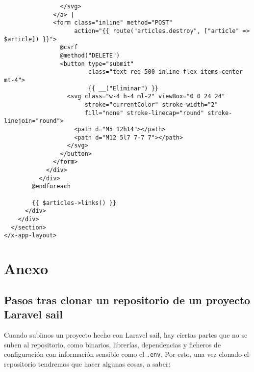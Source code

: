\documentclass[11pt]{article}
\begin{document}
\begin{verbatim}
                </svg>
              </a> |
              <form class="inline" method="POST"
                    action="{{ route("articles.destroy", ["article" => $article]) }}">
                @csrf
                @method("DELETE")
                <button type="submit"
                        class="text-red-500 inline-flex items-center mt-4">
                        {{ __("Eliminar") }}
                  <svg class="w-4 h-4 ml-2" viewBox="0 0 24 24"
                       stroke="currentColor" stroke-width="2"
                       fill="none" stroke-linecap="round" stroke-linejoin="round">
                    <path d="M5 12h14"></path>
                    <path d="M12 5l7 7-7 7"></path>
                  </svg>
                </button>
              </form>
            </div>
          </div>
        @endforeach

        {{ $articles->links() }}
      </div>
    </div>
  </section>
</x-app-layout>
\end{verbatim}

\newpage

\section{Anexo}
\label{sec:org0eab5a6}
\subsection{Pasos tras clonar un repositorio de un proyecto Laravel sail}
\label{sec:orge08f673}
Cuando subimos un proyecto hecho con Laravel sail, hay ciertas partes
que no se suben al repositorio, como binarios, librerías, dependencias
y ficheros de configuración con información sensible como el
\texttt{.env}. Por esto, una vez clonado el repositorio tendremos que hacer
algunas cosas, a saber:
\end{document}
